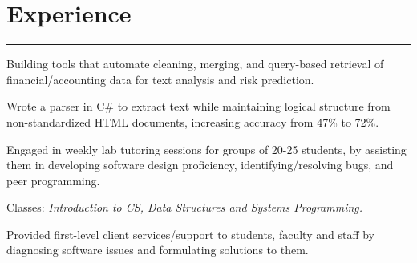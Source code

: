 \documentclass[]{dafirebanks-resume-openfont}
\begin{document}
\begin{minipage}[t]{0.33\textwidth}
%
%

\end{minipage} 
\hfill
\begin{minipage}[t]{0.66\textwidth} 

\vspace{-1.2pt}
\section{Experience}
\vspace{-3pt}
{\color{blue}\hrule} \vspace{5pt}
 
\vspace{\topsep} %
\begin{tightemize}
	\item Building tools that automate cleaning, merging, and query-based retrieval of financial/accounting data for text analysis and risk prediction.
	\item Wrote a parser in C\# to extract text while maintaining logical structure from non-standardized HTML documents, increasing accuracy from 47\% to 72\%.
\end{tightemize}
\sectionsep

 
  
\begin{tightemize}
	\item Engaged in weekly lab tutoring sessions for groups of 20-25 students, by assisting them in developing software design proficiency, identifying/resolving bugs, and peer programming. 
	\item Classes: \textit{Introduction to CS, Data Structures and Systems Programming.}
\end{tightemize}
\sectionsep

\begin{tightemize}
	\item Provided first-level client services/support to students, faculty and staff by diagnosing software issues and formulating solutions to them. 
\end{tightemize}
\sectionsep


\end{minipage}
\end{document}
